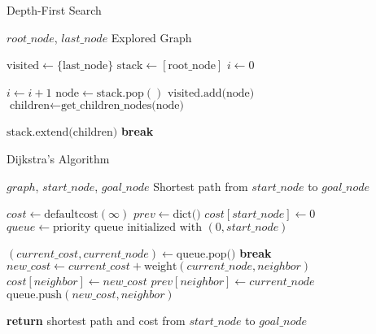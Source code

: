 \begin{algorithm}[H]
  \caption{Depth-First Search}
  \label{alg:dfs}
  \begin{algorithmic}[1]
    \REQUIRE $root\_node$, $last\_node$
    \ENSURE Explored Graph

    \STATE $\text{visited} \gets \{\text{last\_node}\}$ 
    \STATE $\text{stack} \gets [\text{root\_node}]$ 
    \STATE $i \gets 0$ 

    \STATE $i \gets i + 1$
    \STATE $\text{node} \gets \text{stack.pop}()$
    \STATE $\text{visited.add(node)}$
    \STATE $\text{children} \gets \text{get\_children\_nodes(node)}$

    \STATE $\text{stack.extend(children)}$ 
    \ENDIF
    \ENDIF
    \STATE \textbf{break} 
    \ENDIF
    \ENDWHILE
  \end{algorithmic}
\end{algorithm}


\begin{algorithm}[H]
  \caption{Dijkstra's Algorithm}
  \label{alg:dijkstra}
  \begin{algorithmic}[1]
    \REQUIRE $graph$, $start\_node$, $goal\_node$
    \ENSURE Shortest path from $start\_node$ to $goal\_node$

    \STATE $cost \gets \text{defaultcost}(\infty)$ 
    \STATE $prev \gets \text{dict()}$ 
    \STATE $cost[start\_node] \gets 0$
    \STATE $queue \gets \text{priority queue initialized with } (0, start\_node)$

    \STATE $(current\_cost, current\_node) \gets \text{queue.pop()}$
    \STATE \textbf{break}
    \ENDIF
    \STATE $new\_cost \gets current\_cost + \text{weight}(current\_node, neighbor)$
    \STATE $cost[neighbor] \gets new\_cost$
    \STATE $prev[neighbor] \gets current\_node$
    \STATE $\text{queue.push}(new\_cost, neighbor)$
    \ENDIF
    \ENDFOR
    \ENDWHILE

    \STATE \textbf{return} shortest path and cost from $start\_node$ to $goal\_node$
  \end{algorithmic}
\end{algorithm}


